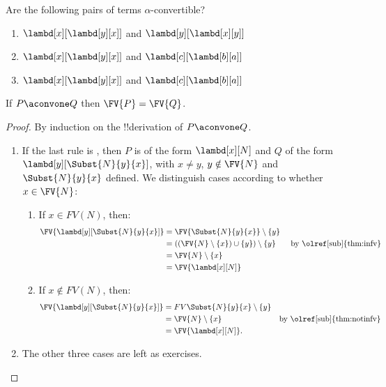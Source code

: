 \documentclass[../../../include/open-logic-section]{subfiles}
\begin{document}
\begin{prob}
  Are the following pairs of terms $\alpha$-convertible?
  \begin{enumerate}
  \item $\lambd[x][\lambd[y][x]]$ and $\lambd[y][\lambd[x][y]]$
  \item $\lambd[x][\lambd[y][x]]$ and $\lambd[c][\lambd[b][a]]$
  \item $\lambd[x][\lambd[y][x]]$ and $\lambd[c][\lambd[b][a]]$
  \end{enumerate}
\end{prob}

\begin{lem}
  If $P \aconvone Q$ then $\FV{P} = \FV{Q}$.
\end{lem}

\begin{proof}
  By induction on the !!{derivation} of $P \aconvone Q$.
  \begin{enumerate}
  \item If the last rule is , then $P$ is of the
    form $\lambd[x][N]$ and $Q$ of the form
    $\lambd[y][\Subst{N}{y}{x}]$, with $x \neq y$, $y \notin \FV{N}$
    and $\Subst{N}{y}{x}$ defined. We distinguish cases according to
    whether $x \in \FV{N}$:
    \begin{enumerate}
    \item If $x \in FV(N)$, then:
      \begin{align*}
        \FV{\lambd[y][\Subst{N}{y}{x}]} &=
        \FV{\Subst{N}{y}{x}} \setminus \{y\} \\
        & = ((\FV{N} \setminus \{x\}) \cup \{y\}) \setminus \{y\}
         && \text{ by \olref[sub]{thm:infv}} \\
        & = \FV{N} \setminus \{x\} \\
        & = \FV{\lambd[x][N]}
      \end{align*}
    \item If $x \notin FV(N)$, then:
      \begin{align*}
        \FV{\lambd[y][\Subst{N}{y}{x}]}
        & = FV{\Subst{N}{y}{x}} \setminus \{y\} \\
        & = \FV{N} \setminus \{x\}
         && \text{by \olref[sub]{thm:notinfv}} \\
        & = \FV{\lambd[x][N]}.
      \end{align*}
    \end{enumerate}
  \item The other three cases are left as exercises. 
  \end{enumerate}
\end{proof}
\end{document}
